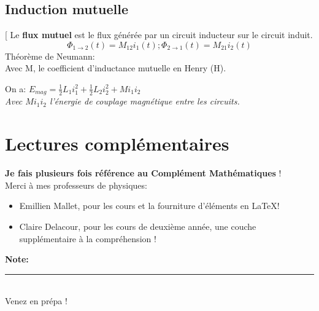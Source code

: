 \documentclass[12pt,hidelinks]{article}
\renewcommand{\thesection}{\arabic{section}}
\begin{document}
        \subsection{Induction mutuelle}
            \begin{DashedDefinition}{}[
             Le \textbf{flux mutuel} est le flux générée par un circuit inducteur sur le circuit induit.
             \[\Phi_{1 \rightarrow 2}(t)=M_{12}i_1(t); \Phi_{2 \rightarrow 1}(t)=M_{21}i_2(t)\]
             Théorème de Neumann:  \\
             Avec M, le coefficient d'inductance mutuelle en Henry (H).
            \end{DashedDefinition}
            On a: $E_{mag}=\frac{1}{2}L_1 i_1^2 + \frac{1}{2}L_2 i_2^2 + Mi_1i_2$ \\
            \textit{Avec $Mi_1i_2$ l'énergie de couplage magnétique entre les circuits.}
\newpage
%
\section{Lectures complémentaires}\label{sec:resources}
\vspace{3cm}
\textbf{Je fais plusieurs fois référence au Complément Mathématiques} ! \\
Merci à mes professeurs de physiques:
\begin{itemize}
    \item Emillien Mallet, pour les cours et la fourniture d'éléments en \LaTeX !
    \item Claire Delacour, pour les cours de deuxième année, une couche supplémentaire à la compréhension !
\end{itemize}


    \vfill
    \small{\noindent \textbf{Note:} \vspace{-3mm}\\
    \noindent \rule{3.3cm}{0.5pt} \\
        Venez en prépa !}
\newpage

\end{document}
